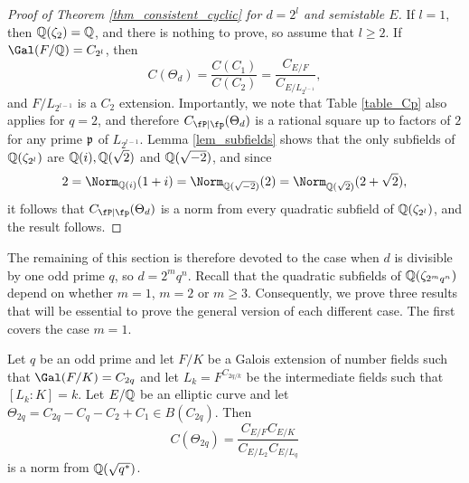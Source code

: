\begin{proof}[Proof of Theorem \ref{thm_consistent_cyclic} for $d=2^l$ and semistable $E$]

    If $l=1$, then $\mathbb{Q}(\zeta_2)=\mathbb{Q}$, and there is nothing to prove, so assume that $l\geq2$. If $\Gal(F/\QQ)=C_{2^l}$, then 
    $$C(\Theta_d)=\frac{C(C_1)}{C(C_2)}=\frac{C_{E/F}}{C_{E/L_{2^{l-1}}}},$$
    and $F/L_{2^{l-1}}$ is a $C_2$ extension. Importantly, we note that Table \ref{table_Cp} also applies for $q=2$, and therefore $\Cp(\Theta_d)$ is a rational square up to factors of $2$ for any prime $\mathfrak{p}$ of $L_{2^{l-1}}$. Lemma \ref{lem_subfields} shows that the only subfields of $\mathbb{Q}(\zeta_{2^l})$ are $\mathbb{Q}(i),\mathbb{Q}(\sqrt{2})$ and $\mathbb{Q}(\sqrt{-2})$, and since
    $$2=\Norm_{\QQ(i)}(1+i)=\Norm_{\QQ(\sqrt{-2})}(2)=\Norm_{\QQ(\sqrt{2})}(2+\sqrt{2}),$$
    it follows that $\Cp(\Theta_d)$ is a norm from every quadratic subfield of $\mathbb{Q}(\zeta_{2^l})$, and the result follows.

\end{proof}

The remaining of this section is therefore devoted to the case when $d$ is divisible by one odd prime $q$, so $d=2^mq^n$. 
Recall that the quadratic subfields of $\mathbb{Q}(\zeta_{2^mq^n})$ depend on whether $m=1$, $m=2$ or $m\geq 3$. Consequently, we prove three results that will be essential to prove the general version of each different case. The first covers the case $m=1$.

\begin{lemma}\label{lem_C2p}
    Let $q$ be an odd prime and let $F/K$ be a Galois extension of number fields such that $\Gal(F/K)=C_{2q}$ and let $L_k=F^{C_{2q/k}}$ be the intermediate fields such that $[L_k:K]=k$. Let $E/\mathbb{Q}$ be an elliptic curve and let $\Theta_{2q}=C_{2q}-C_q-C_2+C_1\in B(C_{2q})$. Then
    $$C(\Theta_{2q})=\frac{C_{E/F}C_{E/K}}{C_{E/L_2}C_{E/L_q}}$$
    is a norm from $\mathbb{Q}(\sqrt{q^*})$.
\end{lemma}

